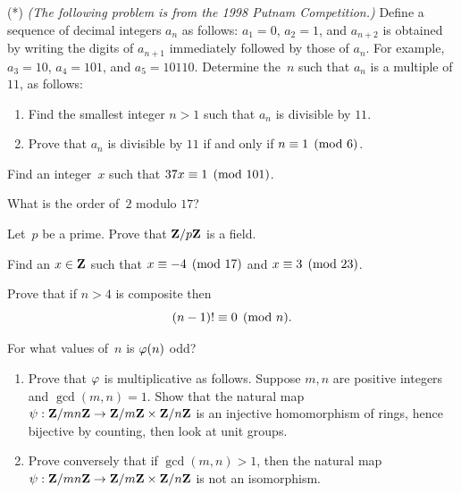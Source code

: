 \begin{exercises}
\item \label{ex:putnam98}
(*) {\em (The following problem is from the 1998 Putnam Competition.)}  Define a
sequence of decimal integers $a_n$ as follows: $a_1 = 0$, $a_2 = 1$, and
$a_{n+2}$ is obtained by writing the digits of $a_{n+1}$ immediately
followed by those of $a_n$.  For example, $a_3 = 10$, $a_4 = 101$,
and $a_5 = 10110$.
Determine the~$n$ such that $a_n$ is a multiple of $11$, as follows:
\begin{enumerate}
\item Find the smallest integer $n>1$ such that $a_n$ is divisible by
$11$.
\item Prove that $a_n$ is divisible by $11$ if and only if
$n\equiv 1\pmod{6}$.
\end{enumerate}

\item\label{ex:invmod} Find an integer~$x$ such that $37x \equiv 1\pmod{101}$.

\item\label{ex:ordmod} What is the order of~$2$ modulo $17$?


\item\label{ex:zpfield}
Let~$p$ be a prime.  Prove that $\mathbf{Z}/p\mathbf{Z}{}$ is a field.

\item\label{ex:crt} Find an $x\in\mathbf{Z}$ such that
$x \equiv -4 \pmod{17}$ and $x\equiv 3\pmod{23}$.



\item\label{ex:wilson2} Prove that if $n>4$ is composite then
$$
   (n-1)! \equiv 0 \pmod{n}.
$$

\item\label{ex:phiodd} For what values of~$n$ is $\varphi(n)$ odd?

\item\label{ex:multproof2}
\begin{enumerate}
\item Prove that $\varphi$ is multiplicative as follows.  Suppose $m,n$ are
positive integers and $\gcd(m,n)=1$.  Show that
the natural map $\psi:\mathbf{Z}/mn\mathbf{Z}{} \rightarrow \mathbf{Z}/m\mathbf{Z}{} \times \mathbf{Z}/n\mathbf{Z}{}$ is
an injective homomorphism of rings, hence bijective by counting, then
look at unit groups.
\item Prove conversely that if $\gcd(m,n)>1$, then
the natural map $\psi:\mathbf{Z}/mn\mathbf{Z}{} \rightarrow \mathbf{Z}/m\mathbf{Z}{} \times \mathbf{Z}/n\mathbf{Z}{}$
is not an isomorphism.
\end{enumerate}




\end{exercises}
